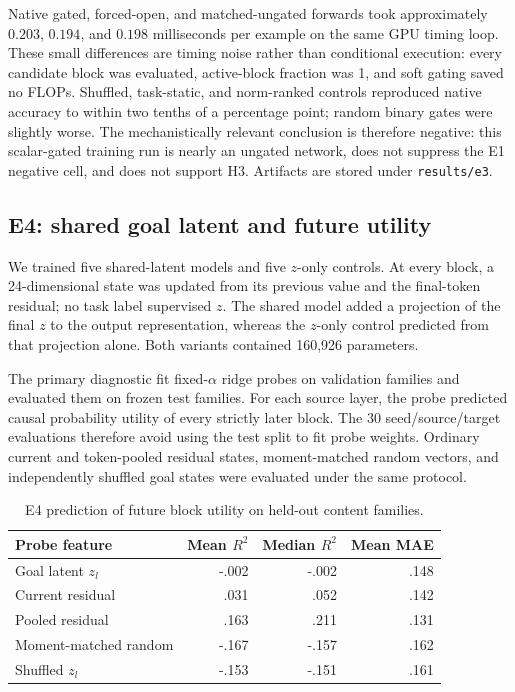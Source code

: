 \documentclass[10pt]{article}
\begin{document}
Native gated, forced-open, and matched-ungated forwards took approximately $0.203$, $0.194$, and $0.198$ milliseconds per example on the same GPU timing loop. These small differences are timing noise rather than conditional execution: every candidate block was evaluated, active-block fraction was 1, and soft gating saved no FLOPs. Shuffled, task-static, and norm-ranked controls reproduced native accuracy to within two tenths of a percentage point; random binary gates were slightly worse. The mechanistically relevant conclusion is therefore negative: this scalar-gated training run is nearly an ungated network, does not suppress the E1 negative cell, and does not support H3. Artifacts are stored under \texttt{results/e3}.

\subsection{E4: shared goal latent and future utility}
We trained five shared-latent models and five $z$-only controls. At every block, a 24-dimensional state was updated from its previous value and the final-token residual; no task label supervised $z$. The shared model added a projection of the final $z$ to the output representation, whereas the $z$-only control predicted from that projection alone. Both variants contained 160,926 parameters.

The primary diagnostic fit fixed-$\alpha$ ridge probes on validation families and evaluated them on frozen test families. For each source layer, the probe predicted causal probability utility of every strictly later block. The 30 seed/source/target evaluations therefore avoid using the test split to fit probe weights. Ordinary current and token-pooled residual states, moment-matched random vectors, and independently shuffled goal states were evaluated under the same protocol.

\begin{table}[ht]
\centering
\caption{E4 prediction of future block utility on held-out content families.}
\begin{tabular}{lrrr}
\toprule
Probe feature & Mean $R^2$ & Median $R^2$ & Mean MAE \\
\midrule
Goal latent $z_l$ & -.002 & -.002 & .148 \\
Current residual & .031 & .052 & .142 \\
Pooled residual & .163 & .211 & .131 \\
Moment-matched random & -.167 & -.157 & .162 \\
Shuffled $z_l$ & -.153 & -.151 & .161 \\
\bottomrule
\end{tabular}
\end{table}
\end{document}
